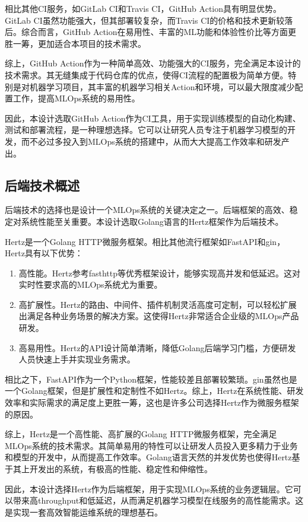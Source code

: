 \documentclass{HDU-Bachelor-Thesis}
\begin{document}
相比其他CI服务，如GitLab CI和Travis CI，GitHub Action具有明显优势。GitLab CI虽然功能强大，但其部署较复杂，而Travis CI的价格和技术更新较落后。综合而言，GitHub Action在易用性、丰富的ML功能和体验性价比等方面更胜一筹，更加适合本项目的技术需求。

综上，GitHub Action作为一种简单高效、功能强大的CI服务，完全满足本设计的技术需求。其无缝集成于代码仓库的优点，使得CI流程的配置极为简单方便。特别是对机器学习项目，其丰富的机器学习相关Action和环境，可以最大限度减少配置工作，提高MLOps系统的易用性。

因此，本设计选取GitHub Action作为CI工具，用于实现训练模型的自动化构建、测试和部署流程，是一种理想选择。它可以让研究人员专注于机器学习模型的开发，而不必过多投入到MLOps系统的搭建中，从而大大提高工作效率和研发产出。

\subsection{后端技术概述}

后端技术的选择也是设计一个MLOps系统的关键决定之一。后端框架的高效、稳定对系统性能至关重要。本设计选取Golang语言的Hertz框架作为后端技术。

Hertz是一个Golang HTTP微服务框架。相比其他流行框架如FastAPI和gin，Hertz具有以下优势：

\begin{enumerate} 
    \item 高性能。Hertz参考fasthttp等优秀框架设计，能够实现高并发和低延迟。这对实时性要求高的MLOps系统尤为重要。  
    \item 高扩展性。Hertz的路由、中间件、插件机制灵活高度可定制，可以轻松扩展出满足各种业务场景的解决方案。这使得Hertz非常适合企业级的MLOps产品研发。
    \item 高易用性。Hertz的API设计简单清晰，降低Golang后端学习门槛，方便研发人员快速上手并实现业务需求。
\end{enumerate} 

相比之下，FastAPI作为一个Python框架，性能较差且部署较繁琐。gin虽然也是一个Golang框架，但是扩展性和定制性不如Hertz。综上，Hertz在系统性能、研发效率和实际需求的满足度上更胜一筹，这也是许多公司选择Hertz作为微服务框架的原因。

综上，Hertz是一个高性能、高扩展的Golang HTTP微服务框架，完全满足MLOps系统的技术需求。其简单易用的特性可以让研发人员投入更多精力于业务和模型的开发中，从而提高工作效率。Golang语言天然的并发优势也使得Hertz基于其上开发出的系统，有极高的性能、稳定性和伸缩性。

因此，本设计选择Hertz作为后端框架，用于实现MLOps系统的业务逻辑层。它可以带来高throughput和低延迟，从而满足机器学习模型在线服务的高性能需求。这是实现一套高效智能运维系统的理想基石。
\end{document}
